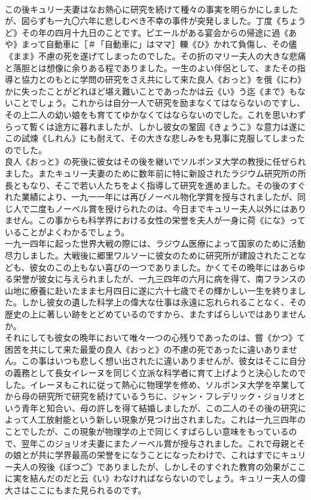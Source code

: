 \documentclass[8pt]{extreport}
\begin{document}
\begin{CJK}{UTF8}{min}
\\	この後キュリー夫妻はなお熱心に研究を続けて種々の事実を明らかにしましたが、図らずも一九〇六年に悲しむべき不幸の事件が突発しました。丁度《ちょうど》その年の四月十九日のことです。ピエールがある宴会からの帰途に過《あや》まって自動車に［＃「自動車に」はママ］轢《ひ》かれて負傷し、その儘《まま》不慮の死を遂げてしまったのでした。その折のマリー夫人の大きな悲痛と落胆とは想像に余りある程でありました。一生のよい伴侶として、またその指導と協力とのもとに学問の研究をさえ共にして来た良人《おっと》を俄《にわ》かに失ったことがどれほど堪え難いことであったかは云《い》う迄《まで》もないことでしょう。これからは自分一人で研究を励まなくてはならないのですし、その上二人の幼い娘をも育ててゆかなくてはならないのでした。これを思いわずらって暫くは途方に暮れましたが、しかし彼女の鞏固《きょうこ》な意力は遂にこの試煉《しれん》にも耐えて、その大きな悲しみをも見事に克服してしまったのでした。
\\	良人《おっと》の死後に彼女はその後を継いでソルボンヌ大学の教授に任ぜられました。またキュリー夫妻のために数年前に特に新設されたラジウム研究所の所長ともなり、そこで若い人たちをよく指導して研究を進めました。その後のすぐれた業績により、一九一一年には再びノーベル物化学賞を授与されましたが、同じ人で二度もノーベル賞を授けられたのは、今日までキュリー夫人以外にはありません。この事からも科学界における女性の栄誉を夫人が一身に荷《にな》っていることがよくわかるでしょう。
\\	一九一四年に起った世界大戦の際には、ラジウム医療によって国家のために活動尽力しました。大戦後に郷里ワルソーに彼女のために研究所が建設されたことなども、彼女のこの上もない喜びの一つでありました。かくてその晩年にはあらゆる栄誉が彼女に与えられましたが、一九三四年の六月に病を得て、南フランスの山地に療養に赴いたまま七月四日に遂に六十七歳でその輝かしい一生を終りました。しかし彼女の遺した科学上の偉大な仕事は永遠に忘れられることなく、その歴史の上に著しい跡をとどめているのですから、またすばらしいではありませんか。
\\	それにしても彼女の晩年において唯々一つの心残りであったのは、嘗《かつ》て困苦を共にして来た最愛の良人《おっと》の不慮の死であったに違いありません。この事はいつも悲しく想い出されたに違いありませんが、彼女はそこに自分の義務として長女イレーヌを同じく立派な科学者に育て上げようと決心したのでした。イレーヌもこれに従って熱心に物理学を修め、ソルボンヌ大学を卒業してから母の研究所で研究を続けているうちに、ジャン・フレデリック・ジョリオという青年と知合い、母の許しを得て結婚しましたが、この二人のその後の研究によって人工放射能という新しい現象が見つけ出されました。これは一九三四年のことでしたが、この現象が物理学の上で同じくすばらしい意味をもっているので、翌年このジョリオ夫妻にまたノーベル賞が授与されました。これで母親とその娘とが共に学界最高の栄誉をになうことになったわけで、これはすでにキュリー夫人の歿後《ぼつご》でありましたが、しかしそのすぐれた教育の効果がここに実を結んだのだと云《い》わなければならないのでしょう。キュリー夫人の偉大さはここにもまた見られるのです。

\end{CJK}
\end{document}

